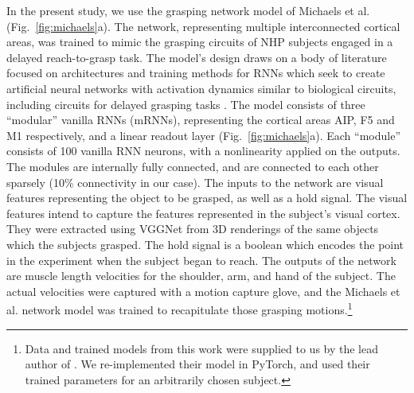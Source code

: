 \documentclass[12pt]{iopart}
\begin{document}
In the present study, we use the grasping network model of Michaels et al. \cite{michaels.mrnn}
(Fig.~\ref{fig:michaels}a). The network, representing multiple interconnected cortical areas, was trained
to mimic the grasping circuits of NHP subjects engaged in a delayed reach-to-grasp task.
The model's design draws on a body of literature focused on architectures and training methods for RNNs which
seek to create artificial neural networks with activation dynamics similar to biological circuits,
including circuits for delayed grasping tasks \cite{susillo.mrnn}. The model consists of three
``modular'' vanilla RNNs (mRNNs), representing the cortical areas AIP, F5 and M1 respectively, and a linear
readout layer (Fig.~\ref{fig:michaels}a). Each ``module'' consists of 100 vanilla
RNN neurons, with a nonlinearity applied on the outputs. The modules are internally fully connected,
and are connected to each other sparsely (10\% connectivity in our case). The inputs to the network are visual features
representing the object to be grasped, as well as a hold signal. The visual features
intend to capture the features represented in the subject's visual cortex. They were extracted using
VGGNet \cite{simonyan.vgg} from 3D renderings of the same objects which the subjects grasped. The hold signal is
a boolean which encodes the point in the experiment when the subject began to reach. The outputs of the
network are muscle length velocities for the shoulder, arm, and hand of the subject. The actual
velocities were captured with a motion capture glove, and the Michaels et al. network model 
was trained to recapitulate those grasping motions.\footnote{Data and trained models from this work
were supplied to us by the lead author of \cite{michaels.mrnn}. We re-implemented their model in PyTorch,
and used their trained parameters for an arbitrarily chosen subject.} 
\end{document}
